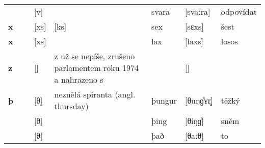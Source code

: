 \begin{longtable}{>{\bfseries}lX>{\IPAfont}lXl>{\IPAfont}ll}
 &  & {[v]} &   & svara & {[svaːra]} & odpovídat \\ 
x &  & {[xs]} & [ks] & sex & {[sɛxs]} & šest \\ 
x  &  & {[xs]} &   & lax & {[laxs]} & losos \\ 
z &  & {[]} & z už se nepíše, zrušeno parlamentem roku 1974 a nahrazeno s &   & {[]} &  \\ 
þ &  & {[θ]} & neznělá spiranta (angl. thursday) & þungur & {[θuŋɡ̊ʏr̥]} & těžký \\ 
 &  & {[θ]} &   & þing & {[θiŋɡ̊]} & sněm \\ 
 &  & {[θ]} &   & það & {[θaːθ]} & to \\ 
\bottomrule
\end{longtable}

